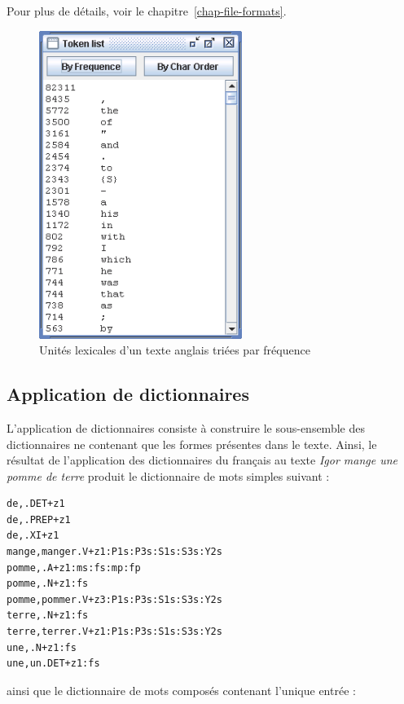\bigskip
\noindent Pour plus de détails, voir le chapitre~\ref{chap-file-formats}.

\begin{figure}[!ht]
\begin{center}
\includegraphics[height=10cm]{resources/img/fig2-12.png}
\caption{Unités lexicales d’un texte anglais triées par fréquence}
\end{center}
\end{figure}



\subsection{Application de dictionnaires}
\label{text-applying-dictionaries}
L’application de dictionnaires consiste à construire le sous-ensemble des dictionnaires
ne contenant que les formes présentes dans le texte. Ainsi, le résultat de l’application des
dictionnaires du français au texte \textit{Igor mange une pomme de terre} produit le dictionnaire de
mots simples suivant :

\bigskip
\begin{verbatim}
de,.DET+z1
de,.PREP+z1
de,.XI+z1
mange,manger.V+z1:P1s:P3s:S1s:S3s:Y2s
pomme,.A+z1:ms:fs:mp:fp
pomme,.N+z1:fs
pomme,pommer.V+z3:P1s:P3s:S1s:S3s:Y2s
terre,.N+z1:fs
terre,terrer.V+z1:P1s:P3s:S1s:S3s:Y2s
une,.N+z1:fs
une,un.DET+z1:fs
\end{verbatim}

\bigskip
\noindent ainsi que le dictionnaire de mots composés contenant l’unique entrée
:

